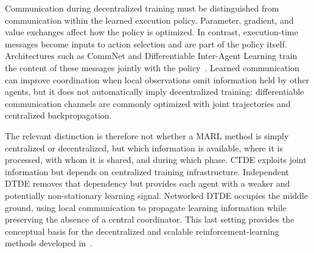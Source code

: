 Communication during decentralized training must be distinguished from
communication within the learned execution policy.
%
Parameter, gradient, and value exchanges affect how the policy is optimized.
In contrast, execution-time messages become inputs to action selection and are
part of the policy itself.
%
Architectures such as CommNet and Differentiable Inter-Agent Learning train the
content of these messages jointly with the
policy~\cite{DBLP:conf/nips/SukhbaatarSF16,DBLP:conf/icml/FoersterAFW16}.
%
Learned communication can improve coordination when local observations omit
information held by other agents, but it does not automatically imply
decentralized training: differentiable communication channels are commonly
optimized with joint trajectories and centralized backpropagation.

The relevant distinction is therefore not whether a MARL method is simply
centralized or decentralized, but which information is available, where it is
processed, with whom it is shared, and during which phase.
%
CTDE exploits joint information but depends on centralized training
infrastructure. Independent DTDE removes that dependency but provides each agent
with a weaker and potentially non-stationary learning signal. Networked DTDE
occupies the middle ground, using local communication to propagate learning
information while preserving the absence of a central coordinator.
%
This last setting provides the conceptual basis for the decentralized and
scalable reinforcement-learning methods developed in~.